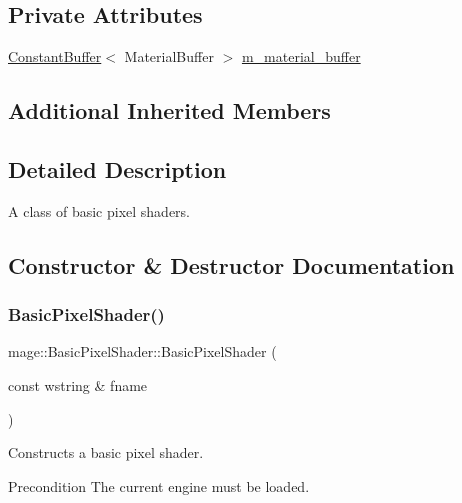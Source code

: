 \subsection*{Private Attributes}
\begin{DoxyCompactItemize}
\item 
\hyperlink{structmage_1_1_constant_buffer}{Constant\+Buffer}$<$ Material\+Buffer $>$ \hyperlink{classmage_1_1_basic_pixel_shader_aa61f52d3524276e234dbd2a1f3f13d6d}{m\+\_\+material\+\_\+buffer}
\end{DoxyCompactItemize}
\subsection*{Additional Inherited Members}


\subsection{Detailed Description}
A class of basic pixel shaders. 

\subsection{Constructor \& Destructor Documentation}
\hypertarget{classmage_1_1_basic_pixel_shader_ae89993e3ba1ab6461e4e984ee8c7b819}{}\label{classmage_1_1_basic_pixel_shader_ae89993e3ba1ab6461e4e984ee8c7b819} 
\subsubsection{\texorpdfstring{Basic\+Pixel\+Shader()}{BasicPixelShader()}\hspace{0.1cm}{\footnotesize\ttfamily [1/6]}}
{\footnotesize\ttfamily mage\+::\+Basic\+Pixel\+Shader\+::\+Basic\+Pixel\+Shader (\begin{DoxyParamCaption}\item[{const wstring \&}]{fname }\end{DoxyParamCaption})\hspace{0.3cm}{\ttfamily [explicit]}}

Constructs a basic pixel shader.

\begin{DoxyPrecond}{Precondition}
The current engine must be loaded. 
\end{DoxyPrecond}

